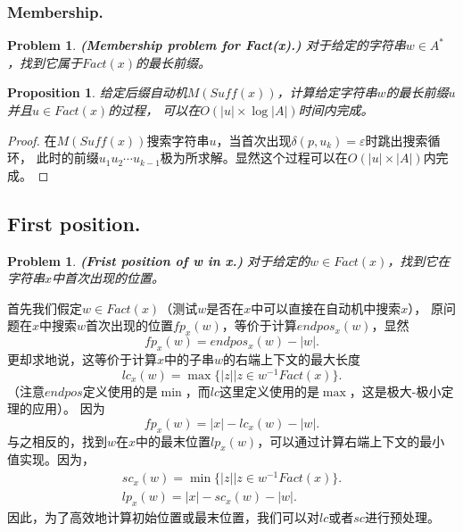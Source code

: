 \documentclass[UTF8]{ctexart}
\newtheorem{prop}[thm]{Proposition}
\newtheorem{prob}[thm]{Problem}
\theoremstyle{definition}
\theoremstyle{remark}
\numberwithin{equation}{subsection}
\newcommand{\Emph}{\textbf}
\newcommand{\Suff}{\textit{Suff}}
\begin{document}
\subsubsection{Membership.}
\label{subsub:idx_membership}

	\begin{prob}
	\label{prob:index_membership}
		\Emph{(Membership problem for Fact(x).)}
		对于给定的字符串$w \in A^*$，找到它属于$Fact(x)$的最长前缀。
	\end{prob}
	
	\begin{prop}
		给定后缀自动机$M(\Suff(x))$，计算给定字符串$w$的最长前缀$u$并且$u \in Fact(x)$的过程，
		可以在$O(|u| \times \log |A|)$时间内完成。
	\end{prop}
	\begin{proof}
		在$M(\Suff(x))$搜索字符串$u$，当首次出现$\delta(p, u_k) = \varepsilon$时跳出搜索循环，
		此时的前缀$u_1 u_2 \cdots u_{k-1}$极为所求解。显然这个过程可以在$O(|u| \times |A|)$内完成。
	\end{proof}
	
\subsection{First position.}
\label{subsub:idx_fp}
	
	\begin{prob}
	\label{prob:index_fir_pos}
		\Emph{(Frist position of w in x.)}
		对于给定的$w \in Fact(x)$，找到它在字符串$x$中首次出现的位置。
	\end{prob}
	
	首先我们假定$w \in Fact(x)$（测试$w$是否在$x$中可以直接在自动机中搜索$x$），
	原问题在$x$中搜索$w$首次出现的位置$fp_x(w)$，等价于计算$endpos_x(w)$，显然
	\[
		fp_x(w) = endpos_x(w) - |w|.
	\]
	更却求地说，这等价于计算$x$中的子串$w$的右端上下文的最大长度
	\[
		lc_x(w) = \max \{ |z| | z \in w^{-1} Fact(x) \}.
	\]
	（注意$endpos$定义使用的是$\min$，而$lc$这里定义使用的是$\max$，这是极大-极小定理的应用）。
	因为
	\[
		fp_x(w) = |x| - lc_x(w) - |w|.
	\]
	与之相反的，找到$w$在$x$中的最末位置$lp_x(w)$，可以通过计算右端上下文的最小值实现。因为，
	\begin{align*}
		sc_x(w) = \min \{ |z| | z \in w^{-1} Fact(x) \}.	\\
		lp_x(w) = |x| - sc_x(w) - |w|.
	\end{align*}
	因此，为了高效地计算初始位置或最末位置，我们可以对$lc$或者$sc$进行预处理。
	
\end{document}
